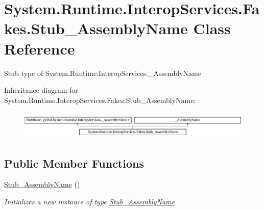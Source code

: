 \hypertarget{class_system_1_1_runtime_1_1_interop_services_1_1_fakes_1_1_stub___assembly_name}{\section{System.\-Runtime.\-Interop\-Services.\-Fakes.\-Stub\-\_\-\-Assembly\-Name Class Reference}
\label{class_system_1_1_runtime_1_1_interop_services_1_1_fakes_1_1_stub___assembly_name}
}


Stub type of System.\-Runtime.\-Interop\-Services.\-\_\-\-Assembly\-Name 


Inheritance diagram for System.\-Runtime.\-Interop\-Services.\-Fakes.\-Stub\-\_\-\-Assembly\-Name\-:\begin{figure}[H]
\begin{center}
\leavevmode
\includegraphics[height=1.355932cm]{class_system_1_1_runtime_1_1_interop_services_1_1_fakes_1_1_stub___assembly_name}
\end{center}
\end{figure}
\subsection*{Public Member Functions}
\begin{DoxyCompactItemize}
\item 
\hyperlink{class_system_1_1_runtime_1_1_interop_services_1_1_fakes_1_1_stub___assembly_name_ae0a58746eb15e219c0a028baf3658881}{Stub\-\_\-\-Assembly\-Name} ()
\begin{DoxyCompactList}\small\item\em Initializes a new instance of type \hyperlink{class_system_1_1_runtime_1_1_interop_services_1_1_fakes_1_1_stub___assembly_name}{Stub\-\_\-\-Assembly\-Name}\end{DoxyCompactList}\end{DoxyCompactItemize}
